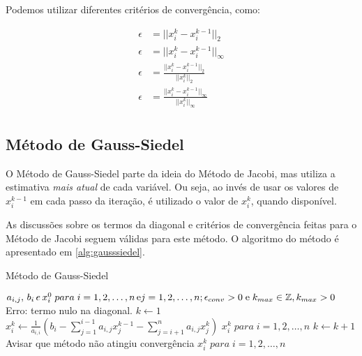 \documentclass[final,5p]{elsarticle}
\numberwithin{equation}{section}
\begin{document}
        Podemos utilizar diferentes critérios de convergência, como:

        \begin{align}
            \epsilon &= ||x_i^k - x_i^{k-1}||_2 \label{eq:conva} \\
            \epsilon &= ||x_i^k - x_i^{k-1}||_\infty \label{eq:convb} \\
            \epsilon &= \frac{||x_i^k - x_i^{k-1}||_2}{||x_i^k||_2} \label{eq:convc} \\
            \epsilon &= \frac{||x_i^k - x_i^{k-1}||_\infty}{||x_i^k||_\infty} \label{eq:convd} \\
        \end{align}

    \subsection{Método de Gauss-Siedel}

        O Método de Gauss-Siedel parte da ideia do Método de Jacobi, mas utiliza a estimativa \emph{mais atual} de cada variável. Ou seja, ao invés de usar os valores de $x_i^{k-1}$ em cada passo da iteração, é utilizado o valor de $x_i^k$, quando disponível.

        As discussões sobre os termos da diagonal e critérios de convergência feitas para o Método de Jacobi seguem válidas para este método. O algoritmo do método é apresentado em \ref{alg:gausssiedel}.

        \begin{algorithm}
            \caption{Método de Gauss-Siedel}\label{alg:gausssiedel}
            \begin{algorithmic}
                \Require $a_{i,j},\,b_i\,e\, x_i^0\; para \; i=1,2,\ldots,n\,\text{e}\\j=1,2,\ldots,n;\\\epsilon_{conv} > 0\;\text{e}\; k_{max} \in \mathbb{Z}, k_{max} > 0$
                        \State \Return Erro: termo nulo na diagonal.
                    \EndIf
                \EndFor
                \State $k \gets 1$
                        \State $x_i^k \gets \frac{1}{a_{i,i}} ( b_i - \sum^{i-1}_{j=1} a_{i,j} x_j^{k-1} - \sum^{n}_{j=i+1} a_{i,j} x_j^{k})$
                    \EndFor
                        \State \Return $x_i^k \; para \; i=1,2,\ldots,n$
                    \EndIf
                    \State $k \gets k+1$
                \EndWhile
                \State Avisar que método não atingiu convergência
                \State \Return $x_i^k \; para \; i=1,2,\ldots,n$
            \end{algorithmic}
        \end{algorithm}
\end{document}
